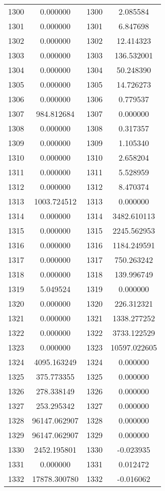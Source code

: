 \documentclass[12pt]{article}
\begin{document}
\begin{longtable}{@{}cccc@{}}
1300 & 0.000000 & 1300 & 2.085584 \\
1301 & 0.000000 & 1301 & 6.847698 \\
1302 & 0.000000 & 1302 & 12.414323 \\
1303 & 0.000000 & 1303 & 136.532001 \\
1304 & 0.000000 & 1304 & 50.248390 \\
1305 & 0.000000 & 1305 & 14.726273 \\
1306 & 0.000000 & 1306 & 0.779537 \\
1307 & 984.812684 & 1307 & 0.000000 \\
1308 & 0.000000 & 1308 & 0.317357 \\
1309 & 0.000000 & 1309 & 1.105340 \\
1310 & 0.000000 & 1310 & 2.658204 \\
1311 & 0.000000 & 1311 & 5.528959 \\
1312 & 0.000000 & 1312 & 8.470374 \\
1313 & 1003.724512 & 1313 & 0.000000 \\
1314 & 0.000000 & 1314 & 3482.610113 \\
1315 & 0.000000 & 1315 & 2245.562953 \\
1316 & 0.000000 & 1316 & 1184.249591 \\
1317 & 0.000000 & 1317 & 750.263242 \\
1318 & 0.000000 & 1318 & 139.996749 \\
1319 & 5.049524 & 1319 & 0.000000 \\
1320 & 0.000000 & 1320 & 226.312321 \\
1321 & 0.000000 & 1321 & 1338.277252 \\
1322 & 0.000000 & 1322 & 3733.122529 \\
1323 & 0.000000 & 1323 & 10597.022605 \\
1324 & 4095.163249 & 1324 & 0.000000 \\
1325 & 375.773355 & 1325 & 0.000000 \\
1326 & 278.338149 & 1326 & 0.000000 \\
1327 & 253.295342 & 1327 & 0.000000 \\
1328 & 96147.062907 & 1328 & 0.000000 \\
1329 & 96147.062907 & 1329 & 0.000000 \\
1330 & 2452.195801 & 1330 & -0.023935 \\
1331 & 0.000000 & 1331 & 0.012472 \\
1332 & 17878.300780 & 1332 & -0.016062 \\

\end{longtable}
\end{document}
